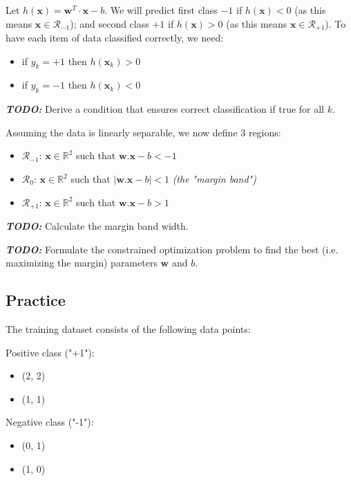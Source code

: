 \documentclass[]{article}
\newcommand{\R}{\mathbb{R}}
\begin{document}
	Let $h(\mathbf{x}) = \mathbf{w}^T\cdot\mathbf{x} - b$.
	We will predict first class $-1$ if $h(\mathbf{x})<0$ (as this means $\mathbf{x} \in \mathcal{R}_{-1}$); and second class $+1$ if $h(\mathbf{x})>0$ (as this means $\mathbf{x} \in \mathcal{R}_{+1}$).
	To have each item of data classified correctly, we need:
	\begin{itemize}
		\item if $y_k = +1$ then $h(\mathbf{x}_k)>0$
		\item if $y_k = -1$ then $h(\mathbf{x}_k)<0$
	\end{itemize}
	\noindent \textbf{\textit{TODO:}}
	Derive a condition that ensures correct classification if true for all $k$.
	
	\vspace{0.5cm}
	
	Assuming the data is linearly separable, we now define 3 regions:
	\begin{itemize}
		\item $\mathcal{R}_{-1}$: $\mathbf{x} \in \R^2$ such that $\mathbf{w}.\mathbf{x} - b < -1$
		\item $\mathcal{R}_{ 0}$: $\mathbf{x} \in \R^2$ such that $\mid \mathbf{w}.\mathbf{x} - b \mid < 1$ \textit{(the "margin band")}
		\item $\mathcal{R}_{+1}$: $\mathbf{x} \in \R^2$ such that $\mathbf{w}.\mathbf{x} - b > 1$
	\end{itemize}
	\noindent \textbf{\textit{TODO:}}
	Calculate the margin band width.
	
	\noindent \textbf{\textit{TODO:}}
	Formulate the constrained optimization problem to find the best (i.e. maximizing the margin) parameters $\mathbf{w}$ and $b$.
	
	\subsection{Practice}
	The training dataset consists of the following data points:
	
	Positive class ("+1"):
	\begin{itemize}
		\item (2, 2)
		\item (1, 1)
	\end{itemize}
	Negative class ("-1"):
	\begin{itemize}
		\item (0, 1)
		\item (1, 0)
	\end{itemize}
	
\end{document}
